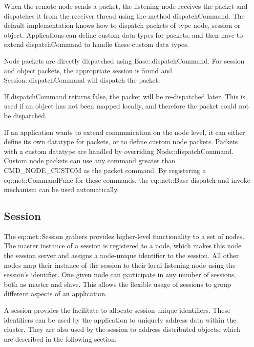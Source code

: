\documentclass[10pt,a4]{scrartcl}
\begin{document}
When the remote node sends a packet, the listening node receives the
packet and dispatches it from the receiver thread using the method
\textsf{dispatchCommand}. The default implementation knows how to
dispatch packets of type node, session or object. Applications can
define custom data types for packets, and then have to extend
\textsf{dispatchCommand} to handle these custom data types.

Node packets are directly dispatched using
\textsf{Base::dispatchCommand}. For session and object packets, the
appropriate session is found and \textsf{Session::dispatchCommand} will
dispatch the packet.

If \textsf{dispatchCommand} returns false, the packet will be
re-dispatched later. This is used if an object has not been mapped
locally, and therefore the packet could not be dispatched.

If an application wants to extend communication on the node level, it
can either define its own datatype for packets, or to define custom node
packets. Packets with a custom datatype are handled by overriding
\textsf{Node::dispatchCommand}. Custom node packets can use any command
greater than \textsf{CMD\_NODE\_CUSTOM} as the packet command. By
registering a \textsf{eq::net::CommandFunc} for these commands, the
\textsf{eq::net::Base} dispatch and invoke mechanism can be used
automatically.

\subsection{Session}

The \textsf{eq::net::Session} gathers provides higher-level
functionality to a set of nodes. The master instance of a session is
registered to a node, which makes this node the session server and
assigns a node-unique identifier to the session. All other nodes map
their instance of the session to their local listening node using the
session's identifier. One given node can participate in any number of
sessions, both as master and slave. This allows the flexible usage of
sessions to group different aspects of an application.

A session provides the facilitate to allocate session-unique
identifiers. These identifiers can be used by the application to
uniquely address data within the cluster. They are also used by the
session to address distributed objects, which are described in the
following section.
\end{document}
